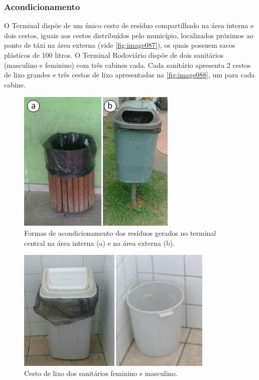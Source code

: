 	
	\subsubsection{Acondicionamento}
	O Terminal dispõe de um único cesto de resíduo compartilhado na área interna e dois cestos, iguais aos cestos distribuídos pelo município, localizados próximos ao ponto de táxi na área externa (vide \autoref{fig:image087}), os quais possuem sacos plásticos de 100 litros. O Terminal Rodoviário dispõe de dois sanitários (masculino e feminino) com três cabines cada. Cada sanitário apresenta 2 cestos de lixo grandes e três cestos de lixo apresentadas na \autoref{fig:image088}, um para cada cabine.
	
	\begin{figure}
		\centering
		\includegraphics[width=0.75\linewidth]{produtos/prodtres/image087}
		\caption{Formas de acondicionamento dos resíduos gerados no terminal central na área interna (a) e na área externa (b).}
		\label{fig:image087}
	\end{figure}
	
	
	\begin{figure}
		\centering
		\includegraphics[width=0.75\linewidth]{produtos/prodtres/image088}
		\caption{Cesto de lixo dos sanitários feminino e masculino.}
		\label{fig:image088}
	\end{figure}
	
